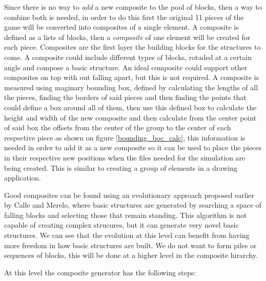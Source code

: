 \documentclass[conference]{IEEEtran}
\begin{document}
    Since there is no way to \textit{add} a new composite to the pool of blocks,
    then a way to combine both is needed, in order to do this first the original
    11 pieces of the game will be converted into composites of a single element.
    A composite is defined as a lists of blocks, then a \textit{composite} of
    one element will be created for each piece. Composites are the first layer
    the building blocks for the structures to come. A composite could include
    different types of blocks, rotaded at a certain angle and compose a basic
    structure. An ideal composite could support other composites on top with out
    falling apart, but this is not required. A composite is measured using
    maginary bounding box, defined by calculating the lengths of all the pieces,
    finding the borders of said pieces and then finding the points that could
    define a box around all of them, then use this defined box to calculate the
    height and width of the new composite and then calculate from the center
    point of said box the offsets from the center of the group to the center of
    each respective piece as shown on figure \ref{bounding_boc_calc}, this
    information is needed in order to add it as a new composite so it can be
    used to place the pieces in their respective new positions when the files
    needed for the simulation are being created. This is similar to creating a
    group of elements in a drawing application.

    Good composites can be found using an evolutionary approach proposed earlier 
    by Calle and Merelo, where basic structures are generated by searching a space
    of falling blocks and selecting those that remain standing. This algorithm is 
    not capable of creating complex strucures, but it can generate very novel basic
    structures. We can see that the evolution at this level can benefit from having
    more freedom in how basic structures are built. We do not want to form piles
    or sequences of blocks, this will be done at a higher level in the composite hirarchy.
    
    At this level the composite generator has the following steps:
    
    
    
\end{document}
